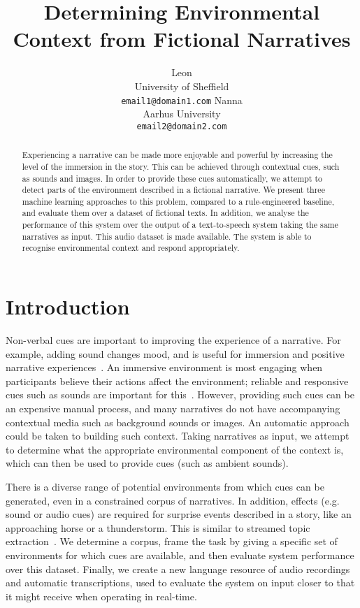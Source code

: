 \documentclass[11pt]{article}
\title{Determining Environmental Context from Fictional Narratives}
\author{Leon\\
  University of Sheffield\\
  {\tt email1@domain1.com}  \And
  Nanna\\
  Aarhus University\\
  {\tt  email2@domain2.com}}
\date{}
\begin{document}
\maketitle
\begin{abstract}
Experiencing a narrative can be made more enjoyable and powerful by increasing the level of the immersion in the story.
This can be achieved through contextual cues, such as sounds and images.
In order to provide these cues automatically, we attempt to detect parts of the environment described in a fictional narrative.
We present three machine learning approaches to this problem, compared to a rule-engineered baseline, and evaluate them over a dataset of fictional texts.
In addition, we analyse the performance of this system over the output of a text-to-speech system taking the same narratives as input.
This audio dataset is made available.
The system is able to recognise environmental context and respond appropriately.
\end{abstract}


\section{Introduction}

Non-verbal cues are important to improving the experience of a narrative. 
For example, adding sound changes mood, and is useful for immersion and positive narrative experiences~\cite{ermi2005fundamental,madden2009collaborative,huiberts2010captivating}.
An immersive environment is most engaging when participants believe their actions affect the environment; reliable and responsive cues such as sounds are important for this~\cite{bobick1999kidsroom}.
However, providing such cues can be an expensive manual process, and many narratives do not have accompanying contextual media such as background sounds or images.
An automatic approach could be taken to building such context.
Taking narratives as input, we attempt to determine what the appropriate environmental component of the context is, which can then be used to provide cues (such as ambient sounds).

There is a diverse range of potential environments from which cues can be generated, even in a constrained corpus of narratives.
In addition, effects (e.g. sound or audio cues) are required for surprise events described in a story, like an approaching horse or a thunderstorm.
This is similar to streamed topic extraction~\cite{allan2002introduction,preotiuc2012trendminer}.
We determine a corpus, frame the task by giving a specific set of environments for which cues are available, and then evaluate system performance over this dataset.
Finally, we create a new language resource of audio recordings and automatic transcriptions, used to evaluate the system on input closer to that it might receive when operating in real-time.
\end{document}
